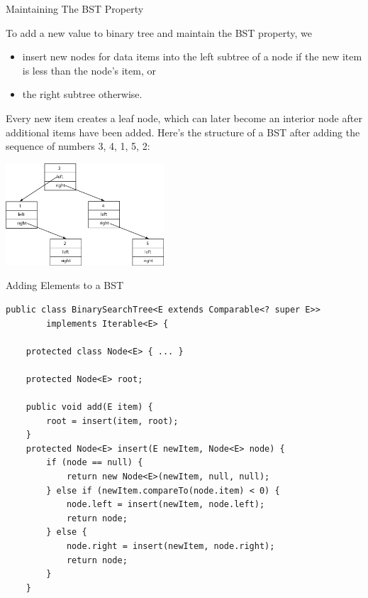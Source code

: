 \documentclass{beamer}
\begin{document}
\begin{frame}[fragile]{Maintaining The BST Property}

To add a new value to binary tree and maintain the BST property, we
\begin{itemize}
\item insert new nodes for data items into the left subtree of a node if the new item is less than the node's item, or
\item the right subtree otherwise.
\end{itemize}
Every new item creates a leaf node, which can later become an interior node after additional items have been added. Here's the structure of a BST after adding the sequence of numbers 3, 4, 1, 5, 2:
\vspace{-.05in}
\begin{center}
\includegraphics[height=1.5in]{binary-tree-nums.png}
\end{center}

\end{frame}

\begin{frame}[fragile]{Adding Elements to a BST}

\begin{lstlisting}[langauge=Java]
public class BinarySearchTree<E extends Comparable<? super E>>
        implements Iterable<E> {

    protected class Node<E> { ... }

    protected Node<E> root;

    public void add(E item) {
        root = insert(item, root);
    }
    protected Node<E> insert(E newItem, Node<E> node) {
        if (node == null) {
            return new Node<E>(newItem, null, null);
        } else if (newItem.compareTo(node.item) < 0) {
            node.left = insert(newItem, node.left);
            return node;
        } else {
            node.right = insert(newItem, node.right);
            return node;
        }
    }
\end{lstlisting}


\end{frame}
\end{document}
